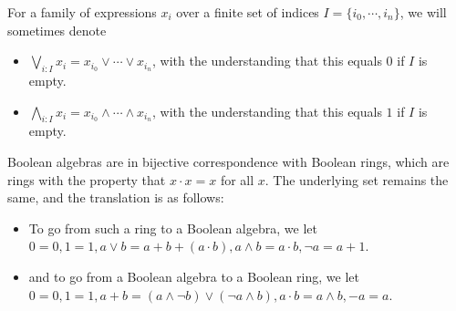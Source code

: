 \documentclass{../util/zariski-small}
\begin{document}
\begin{remark}
  For a family of expressions $x_i$ over a 
  finite set of indices $I = \{i_0, \cdots, i_n\}$, we will sometimes denote 
  \begin{itemize}
    \item $\bigvee_{i:I} x_i = x_{i_0} \vee \cdots \vee x_{i_n}$,
      with the understanding that this equals $0$ if $I$ is empty. 
    \item $\bigwedge_{i:I} x_i = x_{i_0} \wedge \cdots \wedge x_{i_n}$,
      with the understanding that this equals $1$ if $I$ is empty. 
  \end{itemize}
\end{remark}
\begin{remark}
  Boolean algebras are in bijective correspondence with Boolean rings, which 
  are rings with the property that $x\cdot x = x$ for all $x$. 
  The underlying set remains the same, and the translation is as follows:
  \begin{itemize}
    \item 
      To go from such a ring to a Boolean algebra, we let 
      $0 = 0, 1 =1 ,  a \vee b = a + b + ( a \cdot b), a\wedge b = a \cdot b, \neg a = a + 1$. 
    \item 
      and to go from a Boolean algebra to a Boolean ring, we let 
      $0 = 0, 1 = 1, a + b = (a \wedge \neg  b) \vee ( \neg a \wedge b), a \cdot b = a\wedge b , -a = a$. 
\end{itemize}
\end{remark}

%
\end{document}
